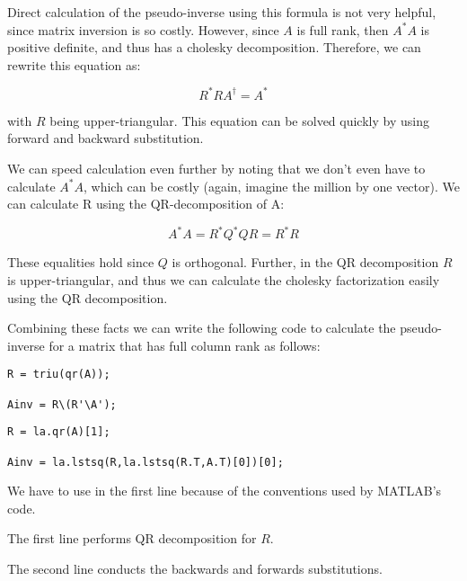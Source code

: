 Direct calculation of the pseudo-inverse using this formula is not very helpful, since matrix inversion is so costly. However, since $A$ is full rank, then $A^*A$ is positive definite, and thus has a cholesky decomposition. Therefore, we can rewrite this equation as:

\[
R^*R A^\dagger = A^*
\]

with $R$ being upper-triangular. This equation can be solved quickly by using forward and backward substitution.

We can speed calculation even further by noting that we don't even have to calculate $A^* A$, which can be costly (again, imagine the million by one vector). We can calculate R using the QR-decomposition of A:

\[
A^* A = R^*Q^*QR = R^* R
\]

These equalities hold since $Q$ is orthogonal. Further, in the QR decomposition $R$ is upper-triangular, and thus we can calculate the cholesky factorization easily using the QR decomposition.

Combining these facts we can write the following code to calculate the pseudo-inverse for a matrix that has full column rank as follows:

\begin{matlab}
\begin{lstlisting}[style=matlab]
R = triu(qr(A));

Ainv = R\(R'\A');
\end{lstlisting}
\end{matlab}
\begin{matlab}
\begin{lstlisting}[style=matlab]
R = la.qr(A)[1];

Ainv = la.lstsq(R,la.lstsq(R.T,A.T)[0])[0];
\end{lstlisting}
\end{matlab}

\begin{matlab}We have to use  in the first line because of the conventions used by MATLAB's  code.\end{matlab}\begin{python}The first line performs QR decomposition for $R$.\end{python} The second line conducts the backwards and forwards substitutions.

